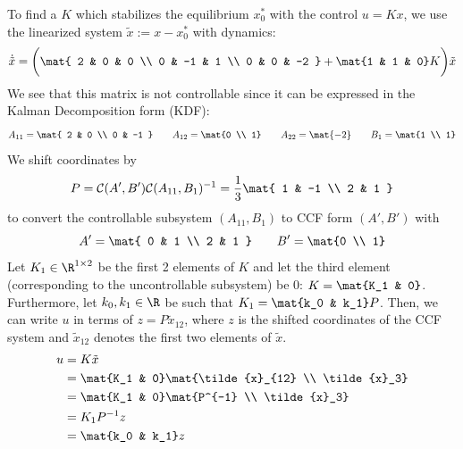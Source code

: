 \documentclass{homework}
\begin{document}
\begin{letterenum}
\item To find a $K$ which stabilizes the equilibrium $x_0^*$ with
the control $u=Kx$, we use the linearized system $\tilde{x} := x - x_0^*$
with dynamics:
\begin{equation*}
    \dot{\tilde{x}} = \biggl(\mat{
        2 & 0 & 0 \\
        0 & -1 & 1 \\
        0 & 0 & -2
    } + \mat{1 & 1 & 0} K \biggr) \tilde{x}
\end{equation*}
We see that this matrix is not controllable since it can be expressed
in the Kalman Decomposition form (KDF):
\begin{equation*}
    A_{11} = \mat{
        2 & 0 \\
        0 & -1
    } \qquad A_{12} = \mat{0 \\ 1} \qquad A_{22} = \mat{-2}
    \qquad B_1 = \mat{1 \\ 1}
\end{equation*}
We shift coordinates by
\begin{equation*}
    P = \control(A', B') \control(A_{11}, B_1)^{-1} = \frac{1}{3}\mat{
        1 & -1 \\
        2 & 1
    }
\end{equation*}
to convert the controllable subsystem $(A_{11}, B_1)$ to CCF form
$(A', B')$ with
\begin{equation*}
    A' = \mat{
        0 & 1 \\
        2 & 1
    } \qquad B' = \mat{0 \\ 1}
\end{equation*}
Let $K_1\in\R^{1 \times 2}$ be the first 2 elements of $K$ and let the third
element (corresponding to the uncontrollable subsystem) be 0: $K = \mat{K_1 & 0}$.
Furthermore, let $k_0,k_1\in\R$ be such that
$K_1 = \mat{k_0 & k_1}P$. Then, we can write
$u$ in terms of $z=P\tilde{x}_{12}$, where $z$ is the shifted
coordinates of the CCF system and $\tilde{x}_{12}$ denotes the first
two elements of $\tilde{x}$.
\begin{align*}
    u &= K\tilde{x} \\
        &= \mat{K_1 & 0} \mat{\tilde{x}_{12} \\ \tilde{x}_3} \\
        &= \mat{K_1 & 0} \mat{P^{-1} \\ \tilde{x}_3} \\
        &= K_1 P^{-1} z \\
        &= \mat{k_0 & k_1} z
\end{align*}

\end{letterenum}
\end{document}
